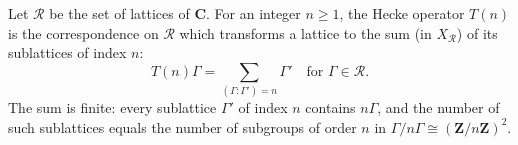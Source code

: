 Let $\mathcal{R}$ be the set of lattices of $\mathbf{C}$. For an integer $n \geq 1$, the Hecke operator $T(n)$ is the correspondence on $\mathcal{R}$ which transforms a lattice to the sum (in $X_\mathcal{R}$) of its sublattices of index $n$:
$$T(n)\Gamma = \sum_{(\Gamma : \Gamma') = n} \Gamma' \quad \text{for } \Gamma \in \mathcal{R}.$$
The sum is finite: every sublattice $\Gamma'$ of index $n$ contains $n\Gamma$, and the number of such sublattices equals the number of subgroups of order $n$ in $\Gamma/n\Gamma \cong (\mathbf{Z}/n\mathbf{Z})^2$.
